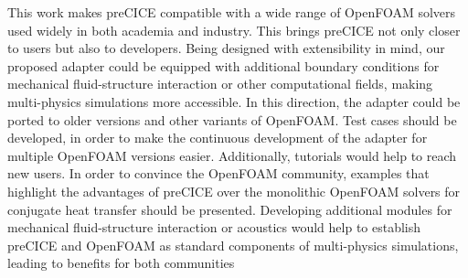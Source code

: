 This work makes preCICE compatible with a wide range of OpenFOAM solvers used
widely in both academia and industry. This brings preCICE not only closer to users but
also to developers. Being designed with extensibility in mind, our proposed adapter could
be equipped with additional boundary conditions for mechanical fluid-structure interaction
or other computational fields, making multi-physics simulations more accessible. In this
direction, the adapter could be ported to older versions and other variants of OpenFOAM.
Test cases should be developed, in order to make the continuous development of the adapter
for multiple OpenFOAM versions easier. Additionally, tutorials would help to reach new
users. In order to convince the OpenFOAM community, examples that highlight the advantages
of preCICE over the monolithic OpenFOAM solvers for conjugate heat transfer
should be presented. Developing additional modules for mechanical fluid-structure interaction
or acoustics would help to establish preCICE and OpenFOAM as standard components
of multi-physics simulations, leading to benefits for both communities





